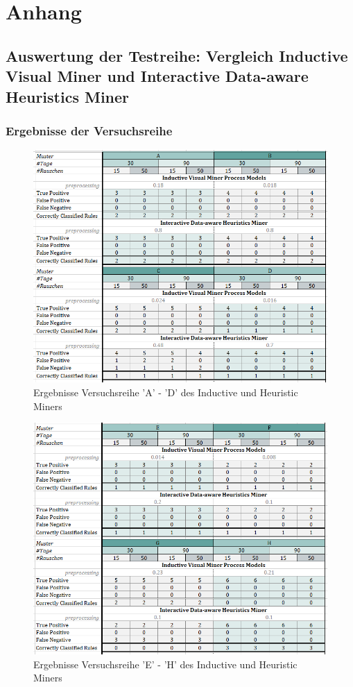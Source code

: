 \chapter{Anhang}
\section{Auswertung der Testreihe: Vergleich Inductive Visual Miner und Interactive Data-aware Heuristics Miner}
\subsection{Ergebnisse der Versuchsreihe}\label{results}
\begin{figure}[!ht]
    \centering
    \includegraphics[width=\textwidth]{figures/Appbildungen/tab1.PNG}
    \caption{Ergebnisse Versuchsreihe 'A' - 'D' des Inductive und Heuristic Miners}
    \label{tab1}
\end{figure}

\begin{figure}[!ht]
    \centering
    \includegraphics[width=\textwidth]{figures/Appbildungen/tab2.PNG}
    \caption{Ergebnisse Versuchsreihe 'E' - 'H' des Inductive und Heuristic Miners}
    \label{tab2}
\end{figure}


